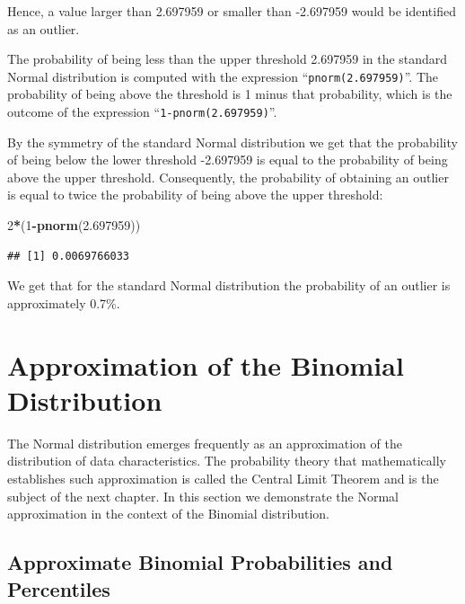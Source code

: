 \documentclass[]{krantz}
\makeatletter
\newenvironment{Shaded}{\begin{snugshade}}{\end{snugshade}}
\newcommand{\DecValTok}[1]{\textcolor[rgb]{0.00,0.00,0.81}{#1}}
\newcommand{\FloatTok}[1]{\textcolor[rgb]{0.00,0.00,0.81}{#1}}
\newcommand{\KeywordTok}[1]{\textcolor[rgb]{0.13,0.29,0.53}{\textbf{#1}}}
\newcommand{\NormalTok}[1]{#1}
\newcommand{\OperatorTok}[1]{\textcolor[rgb]{0.81,0.36,0.00}{\textbf{#1}}}
\newenvironment{kframe}{%
\medskip{}
\setlength{\fboxsep}{.8em}
 \def\at@end@of@kframe{}%
 \ifinner\ifhmode%
  \def\at@end@of@kframe{\end{minipage}}%
  \begin{minipage}{\columnwidth}%
 \fi\fi%
 \def\FrameCommand##1{\hskip\@totalleftmargin \hskip-\fboxsep
 \colorbox{shadecolor}{##1}\hskip-\fboxsep
     \hskip-\linewidth \hskip-\@totalleftmargin \hskip\columnwidth}%
 \MakeFramed {\advance\hsize-\width
   \@totalleftmargin\z@ \linewidth\hsize
   \@setminipage}}%
 {\par\unskip\endMakeFramed%
 \at@end@of@kframe}
\renewenvironment{Shaded}{\begin{kframe}}{\end{kframe}}
\theoremstyle{definition}
\theoremstyle{definition}
\theoremstyle{definition}
\theoremstyle{remark}
\makeatother
\begin{document}
Hence, a value larger than 2.697959 or smaller than -2.697959 would be
identified as an outlier.

The probability of being less than the upper threshold 2.697959 in the
standard Normal distribution is computed with the expression
``\texttt{pnorm(2.697959)}''. The probability of being above the threshold is 1
minus that probability, which is the outcome of the expression
``\texttt{1-pnorm(2.697959)}''.

By the symmetry of the standard Normal distribution we get that the
probability of being below the lower threshold -2.697959 is equal to the
probability of being above the upper threshold. Consequently, the
probability of obtaining an outlier is equal to twice the probability of
being above the upper threshold:

\begin{Shaded}
\begin{Highlighting}[]
\DecValTok{2}\OperatorTok{*}\NormalTok{(}\DecValTok{1}\OperatorTok{-}\KeywordTok{pnorm}\NormalTok{(}\FloatTok{2.697959}\NormalTok{))}
\end{Highlighting}
\end{Shaded}

\begin{verbatim}
## [1] 0.0069766033
\end{verbatim}

We get that for the standard Normal distribution the probability of an
outlier is approximately 0.7\%.

\hypertarget{approximation-of-the-binomial-distribution}{%
\section{Approximation of the Binomial Distribution}\label{approximation-of-the-binomial-distribution}}

The Normal distribution emerges frequently as an approximation of the
distribution of data characteristics. The probability theory that
mathematically establishes such approximation is called the Central
Limit Theorem and is the subject of the next chapter. In this section we
demonstrate the Normal approximation in the context of the Binomial
distribution.

\hypertarget{approximate-binomial-probabilities-and-percentiles}{%
\subsection{Approximate Binomial Probabilities and Percentiles}\label{approximate-binomial-probabilities-and-percentiles}}
\end{document}
